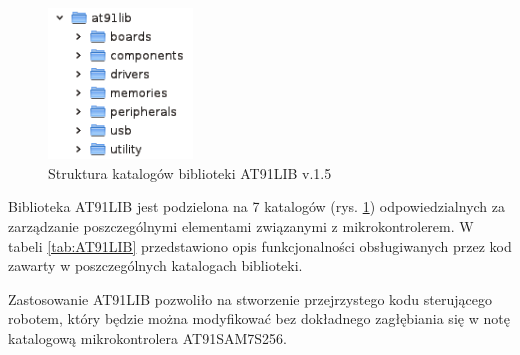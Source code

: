 \begin{figure}[!ht]
 \centering
 \includegraphics[height=40mm]{../images/ch05/at91lib_dirs.png}
 \caption{Struktura katalogów biblioteki AT91LIB v.1.5}
 \label{fig:AT91LIB}
\end{figure}

Biblioteka AT91LIB jest podzielona na 7 katalogów (rys. \ref{fig:AT91LIB}) odpowiedzialnych za zarządzanie poszczególnymi elementami związanymi z mikrokontrolerem. W tabeli \ref{tab:AT91LIB} przedstawiono opis funkcjonalności obsługiwanych przez kod zawarty w poszczególnych katalogach biblioteki.

Zastosowanie AT91LIB pozwoliło na stworzenie przejrzystego kodu sterującego robotem, który będzie można modyfikować bez dokładnego zagłębiania się w notę katalogową mikrokontrolera AT91SAM7S256.